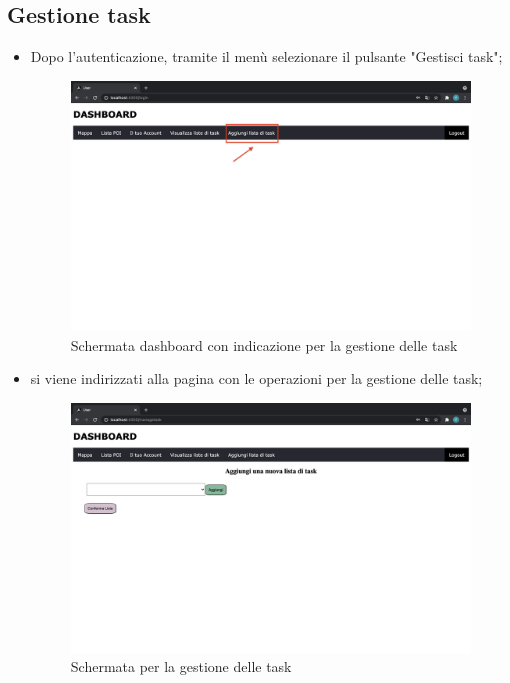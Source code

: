 \subsection{Gestione task}
\begin{itemize}
    \item Dopo l'autenticazione, tramite il menù selezionare il pulsante "Gestisci task";
        \begin{figure}[H]
        \centering
        \includegraphics[scale=0.2]{res/images/dashboard9.png}
        \caption{Schermata dashboard con indicazione per la gestione delle task}
        \end{figure}
    \item si viene indirizzati alla pagina con le operazioni per la gestione delle task; 
    \begin{figure}[H]
        \centering
        \includegraphics[scale=0.12]{res/images/gestiscitask.png}
        \caption{Schermata per la gestione delle task}
    \end{figure}
\end{itemize}





